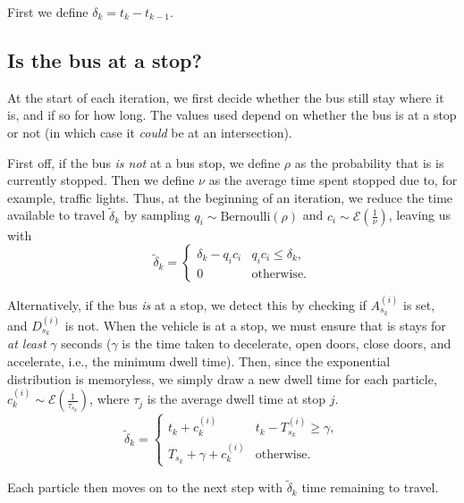 \documentclass[14paper,twoside]{article}
\begin{document}
First we define $\delta_k = t_k - t_{k-1}$.

\subsection{Is the bus at a stop?}

At the start of each iteration, we first decide whether the bus still stay where it is,
and if so for how long.
The values used depend on whether the bus is at a stop or not (in which case it \emph{could} be 
at an intersection).

First off, if the bus \emph{is not} at a bus stop, we define $\rho$ as the probability that is
is currently stopped.
Then we define $\nu$ as the average time spent stopped due to, for example, traffic lights.
Thus, at the beginning of an iteration, we reduce the time available to travel $\tilde \delta_k$ 
by sampling $q_i \sim \mathrm{Bernoulli}(\rho)$ and $c_i \sim \mathcal{E}\left(\frac{1}{\nu}\right)$,
leaving us with
\begin{equation}
  \label{eq:start_intersection}
  \tilde\delta_k = 
  \begin{cases}
    \delta_k - q_i c_i & q_i c_i \leq \delta_k, \\
    0 & \text{otherwise}.
  \end{cases}
\end{equation}

Alternatively, if the bus \emph{is} at a stop, we detect this by checking if $A_{s_k}^{(i)}$ is set, 
and $D_{s_k}^{(i)}$ is not.
When the vehicle is at a stop, we must ensure that is stays for \emph{at least} $\gamma$ seconds
($\gamma$ is the time taken to decelerate, open doors, close doors, and accelerate, 
i.e., the minimum dwell time).
Then, since the exponential distribution is memoryless, we simply draw a new dwell time for each particle,
$c_k^{(i)} \sim \mathcal{E}\left(\frac{1}{\tau_{s_k}}\right)$,
where $\tau_j$ is the average dwell time at stop $j$.
\begin{equation}
  \label{eq:start_stop}
  \tilde\delta_k =
  \begin{cases}
    t_k + c_k^{(i)} & t_k - T_{s_k}^{(i)} \geq \gamma, \\
    T_{s_k} + \gamma + c_k^{(i)} & \text{otherwise}.
  \end{cases}
\end{equation}

Each particle then moves on to the next step with $\tilde\delta_k$ time remaining to travel.
\end{document}

